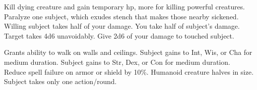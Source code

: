 \begin{swspelllist}
 Kill dying creature and gain temporary hp, more for killing powerful creatures.
 Paralyze one subject, which exudes stench that makes those nearby sickened.
 Willing subject takes half of your damage.
 You take half of subject's damage.
 Target takes 4d6 unavoidably.
 Give 2d6 of your damage to touched subject.

 Grants ability to walk on walls and ceilings.
 Subject gains  to Int, Wis, or Cha for medium duration.
 Subject gains  to Str, Dex, or Con for medium duration.
 Reduce spell failure on armor or shield by 10\%.
 Humanoid creature halves in size.
 Subject takes only one action/round.
\end{swspelllist}

